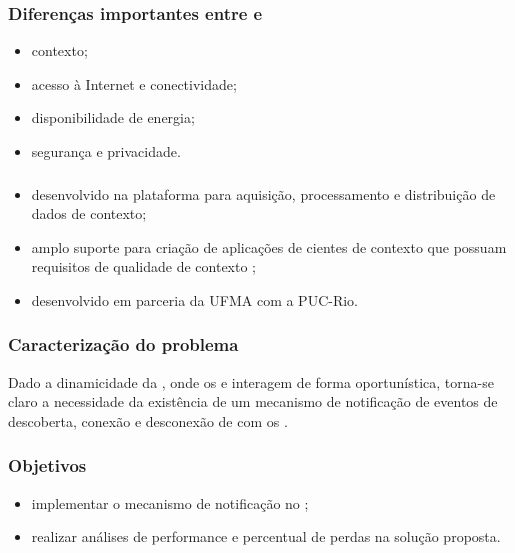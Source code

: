 \documentclass[aspectratio=169]{beamer}
\begin{document}
\begin{frame}
	\frametitle{Diferenças importantes entre \iot e \iomt \cite{nahrstedt:et-al:2016}}
	\begin{itemize}

		\item {contexto};

			\bigskip

		\item {acesso à Internet e conectividade};

			\bigskip

		\item {disponibilidade de energia};

			\bigskip

		\item {segurança e privacidade}.

	\end{itemize}
\end{frame}

\begin{frame}
	\frametitle{\mhubcddl}
	\begin{itemize}
		\item \middleware \iomt desenvolvido na plataforma \android para aquisição, processamento e distribuição de dados de contexto;

			\bigskip
			
		\item amplo suporte para criação de aplicações de \iot cientes de contexto que possuam requisitos de qualidade de contexto \cite{gomes:et-al:2017};

			\bigskip

		\item desenvolvido em parceria da UFMA com a PUC-Rio.
	\end{itemize}
\end{frame}

\begin{frame}
	\frametitle{Caracterização do problema}
	Dado a dinamicidade da \iomt, onde os \smartobjs e \gateways interagem de forma oportunística, torna-se claro a necessidade da existência de um mecanismo de notificação de eventos de descoberta, conexão e desconexão de \smartobjs com os \smartphones.
\end{frame}

\begin{frame}
	\frametitle{Objetivos}
	\begin{itemize}
		\item implementar o mecanismo de notificação no \middleware \mhubcddl;

			\bigskip

		\item realizar análises de performance e percentual de perdas na solução proposta.
	\end{itemize}
		
	
\end{frame}
\end{document}
